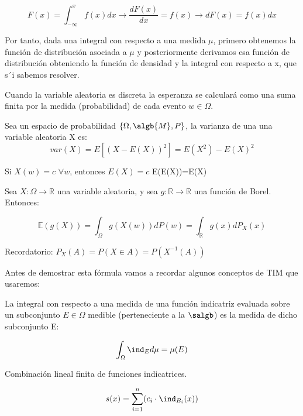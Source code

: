 \documentclass{apuntes}
\begin{document}
\begin{defn}
\[
F(x) = \int_{-\infty}^{x}f(x)dx  \rightarrow \frac{dF(x)}{dx}= f(x) \rightarrow dF(x) = f(x)dx
\]

Por tanto, dada una integral con respecto a una medida $\mu$, primero obtenemos la función de distribución asociada a $\mu$ y posteriormente derivamos esa función de distribución obteniendo la función de densidad y la integral con respecto a x, que s´i sabemos resolver.

Cuando la variable aleatoria es discreta la esperanza se calculará como una suma finita por la medida (probabilidad) de cada evento $w \in \Omega$.

\end{defn}


\begin{defn}[Varianza]
Sea un espacio de probabilidad $\{\Omega, \algb{M},P\}$, la varianza de una una variable aleatoria X es:
\[
var(X)=E[(X-E(X))^2] = E(X^2)-E(X)^2
\]

\obs Si $X(w)=c$  $\forall w$, entonces $E(X)=c$
\obs E(E(X))=E(X)
\end{defn}

\begin{defn}
Sea $X: \Omega \rightarrow \mathbb{R}$ una variable aleatoria, y sea $g:\mathbb{R} \rightarrow \mathbb{R}$ una función de Borel. Entonces:

\[
\mathbb{E}(g(X))=\int_{\Omega}g(X(w))dP(w)=\int_{\mathbb{R}}g(x)dP_X(x)
\]

Recordatorio: $P_X(A)=P(X\in A)=P(X^{-1}(A))$
\end{defn}

Antes de demostrar esta fórmula vamos a recordar algunos conceptos de TIM que usaremos:

\begin{defn}
La integral con respecto a una medida de una función indicatriz evaluada sobre un subconjunto $E \in \Omega$ medible (perteneciente a la $\salgb$) es la medida de dicho subconjunto E:

\[\int_{\Omega} \ind_{E}d\mu = \mu(E)\]
\end{defn}

\begin{defn}
Combinación lineal finita de funciones indicatrices.

\[
s(x) = \sum_{i=1}^{n}(c_i \cdot \ind_{B_i}(x))
\]
\end{defn}
\end{document}

